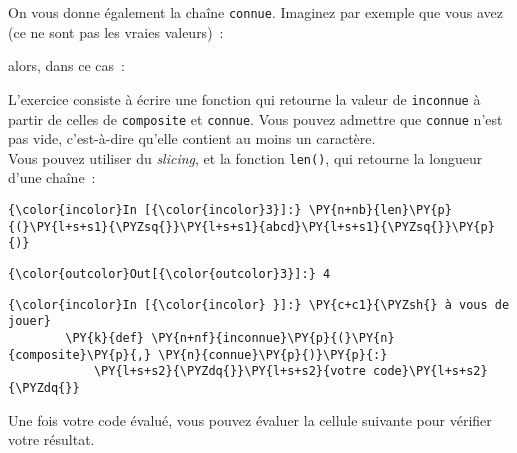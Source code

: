     On vous donne également la chaîne \texttt{connue}. Imaginez par exemple
que vous avez (ce ne sont pas les vraies valeurs)~:

\begin{Shaded}
\begin{Highlighting}[]
\OperatorTok{=} 
\OperatorTok{=} 
\end{Highlighting}
\end{Shaded}

alors, dans ce cas~:

\begin{Shaded}
\begin{Highlighting}[]
\OperatorTok{=} 
\end{Highlighting}
\end{Shaded}

    L'exercice consiste à écrire une fonction qui retourne la valeur de
\texttt{inconnue} à partir de celles de \texttt{composite} et
\texttt{connue}. Vous pouvez admettre que \texttt{connue} n'est pas
vide, c'est-à-dire qu'elle contient au moins un caractère.\\

    Vous pouvez utiliser du \emph{slicing}, et la fonction \texttt{len()},
qui retourne la longueur d'une chaîne~:

    \begin{Verbatim}[commandchars=\\\{\}]
{\color{incolor}In [{\color{incolor}3}]:} \PY{n+nb}{len}\PY{p}{(}\PY{l+s+s1}{\PYZsq{}}\PY{l+s+s1}{abcd}\PY{l+s+s1}{\PYZsq{}}\PY{p}{)}
\end{Verbatim}


\begin{Verbatim}[commandchars=\\\{\}]
{\color{outcolor}Out[{\color{outcolor}3}]:} 4
\end{Verbatim}
            
    \begin{Verbatim}[commandchars=\\\{\}]
{\color{incolor}In [{\color{incolor} }]:} \PY{c+c1}{\PYZsh{} à vous de jouer}
        \PY{k}{def} \PY{n+nf}{inconnue}\PY{p}{(}\PY{n}{composite}\PY{p}{,} \PY{n}{connue}\PY{p}{)}\PY{p}{:}
            \PY{l+s+s2}{\PYZdq{}}\PY{l+s+s2}{votre code}\PY{l+s+s2}{\PYZdq{}}
\end{Verbatim}


    Une fois votre code évalué, vous pouvez évaluer la cellule suivante pour
vérifier votre résultat.

